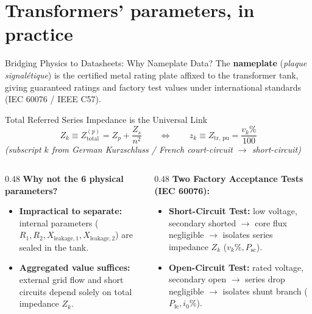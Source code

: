 \section{Transformers' parameters, in practice}
\begin{frame}{Bridging Physics to Datasheets: Why Nameplate Data?}
\footnotesize
The \textbf{nameplate} (\textit{plaque signalétique}) is the certified metal rating plate affixed to the transformer tank, giving guaranteed ratings and factory test values under international standards (IEC 60076 / IEEE C57).

\vspace{0.08cm}
\begin{block}{\small Total Referred Series Impedance is the Universal Link}
\vspace{-0.1cm}
$$Z_k \equiv Z_{\text{total}}^{(p)} = Z_p + \frac{Z_s}{n^2} \qquad \Longleftrightarrow \qquad z_k \equiv Z_{\text{tr, pu}} = \frac{v_k\%}{100}$$
\vspace{-0.2cm}
\centering\scriptsize\textit{(subscript $k$ from German Kurzschluss / French court-circuit $\to$ short-circuit)}
\end{block}

\vspace{0.08cm}
\begin{columns}[T, onlytextwidth]
\begin{column}{0.48\textwidth}
\textbf{Why not the 6 physical parameters?}
\begin{itemize}\setlength{\itemsep}{2pt}\scriptsize
    \item \textbf{Impractical to separate:} internal parameters ($R_1, R_2, X_{\text{leakage}, 1}, X_{\text{leakage}, 2}$) are sealed in the tank.
    \item \textbf{Aggregated value suffices:} external grid flow and short circuits depend solely on total impedance $Z_k$.
\end{itemize}
\end{column}
\begin{column}{0.48\textwidth}
\textbf{Two Factory Acceptance Tests (IEC 60076):}
\begin{itemize}\setlength{\itemsep}{2pt}\scriptsize
    \item \textbf{Short-Circuit Test:} low voltage, secondary shorted $\to$ core flux negligible $\to$ \alert{isolates series impedance} $Z_k$ ($v_k\%, P_{\text{sc}}$).
    \item \textbf{Open-Circuit Test:} rated voltage, secondary open $\to$ series drop negligible $\to$ \alert{isolates shunt branch} ($P_{\text{fe}}, i_0\%$).
\end{itemize}
\end{column}
\end{columns}
\end{frame}

